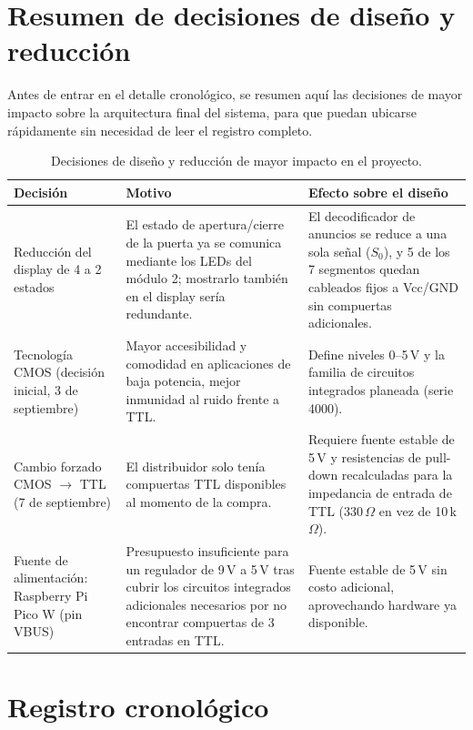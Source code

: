 \documentclass[11pt]{article}
\begin{document}
\section{Resumen de decisiones de diseño y reducción}
\label{sec:resumen}

Antes de entrar en el detalle cronológico, se resumen aquí las decisiones
de mayor impacto sobre la arquitectura final del sistema, para que puedan
ubicarse rápidamente sin necesidad de leer el registro completo.

\begin{table}[h]
\centering
\renewcommand{\arraystretch}{1.4}
\begin{tabular}{p{3.2cm} p{4.3cm} p{6cm}}
\toprule
\textbf{Decisión} & \textbf{Motivo} & \textbf{Efecto sobre el diseño} \\
\midrule
Reducción del display de 4 a 2 estados
& El estado de apertura/cierre de la puerta ya se comunica mediante los
LEDs del módulo 2; mostrarlo también en el display sería redundante.
& El decodificador de anuncios se reduce a una sola señal ($S_0$), y 5 de
los 7 segmentos quedan cableados fijos a Vcc/GND sin compuertas adicionales. \\
\addlinespace
Tecnología CMOS (decisión inicial, 3 de septiembre)
& Mayor accesibilidad y comodidad en aplicaciones de baja potencia, mejor
inmunidad al ruido frente a TTL.
& Define niveles 0--5\,V y la familia de circuitos integrados planeada
(serie 4000). \\
\addlinespace
Cambio forzado CMOS $\rightarrow$ TTL (7 de septiembre)
& El distribuidor solo tenía compuertas TTL disponibles al momento de la
compra.
& Requiere fuente estable de 5\,V y resistencias de pull-down
recalculadas para la impedancia de entrada de TTL (330\,$\Omega$ en vez de
10\,k$\Omega$). \\
\addlinespace
Fuente de alimentación: Raspberry Pi Pico W (pin VBUS)
& Presupuesto insuficiente para un regulador de 9\,V a 5\,V tras cubrir
los circuitos integrados adicionales necesarios por no encontrar
compuertas de 3 entradas en TTL.
& Fuente estable de 5\,V sin costo adicional, aprovechando hardware ya
disponible. \\
\bottomrule
\end{tabular}
\caption{Decisiones de diseño y reducción de mayor impacto en el proyecto.}
\end{table}

\section{Registro cronológico}
\label{sec:registro}
\end{document}
